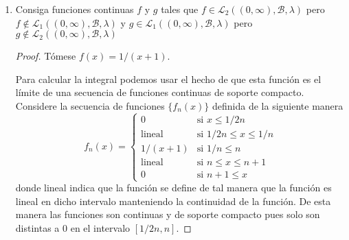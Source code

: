 \documentclass[letter,twoside,12pt]{article}
\numberwithin{equation}{section}
\begin{document}
\begin{enumerate}[label = (\textbf{\arabic*.})]
\begin{proof}
Por otra parte tenemos que para todo $x \in \mathbb{R}_{\geq0} $

$$ 0 \leq \frac{d}{dx} \ln(1+x) = \frac{1}{1+x} \leq 1 = \frac{d}{dx} x. $$

Esto quiere decir, por una parte que ambas funciones son crecientes para $x > 0$ y por otra que la función $x$ crece más rápido que la función $\ln(1+x)$. Por lo tanto concluimos \eqref{eq:ln}.

Podemos usar \eqref{eq:ln} para el caso $x = f/n $ para concluir que

$$ \ln(1+f/n) \leq f/n. $$

A partir de esta expresión se deduce fácilmente que 

$$ n\ln(1+(f/n)^\alpha) \leq \alpha n\ln(1+f/n)  \leq \alpha f. $$

Por lo tanto, concluimos que la secuencia es dominada por $ \alpha f $ y por lo tanto podemos utilizar el teorema de convergencia dominada \cite[Teorema 12.24]{hewitt} para concluir que 

\begin{equation}
\lim_{n \to \infty} \int_X n \ln(1+(f/n)^\alpha) = \int_X \lim_{n \to \infty}  n\ln(1+(f/n)^\alpha))
\end{equation}

de donde concluimos por \eqref{eq:lim} que si $ \alpha = 1 $ entonces la expresión es igual a $ \int_X f d\mu = c $ y si $ \alpha \geq 1 $ entonces la expresión es igual a $ \int_X 0 d\mu = 0 $ 
\end{proof}
\item  Consiga funciones continuas $ f $ y $ g $ tales que $ f \in \mathcal{L}_2((0, \infty), \mathcal{B}, \lambda) $ pero $ f \not \in \mathcal{L}_1((0, \infty), \mathcal{B}, \lambda) $ y
$ g \in \mathcal{L}_1((0, \infty), \mathcal{B}, \lambda)$ pero  $g \not \in \mathcal{L}_2((0, \infty), \mathcal{B}, \lambda) $
\begin{proof}

Tómese $ f(x) = 1/(x+1) $.

Para calcular la integral podemos usar el hecho de que esta función es el límite de una secuencia de funciones continuas de soporte compacto. Considere la secuencia de funciones $ \{ f_{n}(x) \}$ definida de la siguiente manera
$$f_n(x) = \left\{\begin{array}{ll}
0 & \mbox{si } x \leq 1/2n
\\\mbox{lineal} & \mbox{si } 1/2n \leq x \leq 1/n
\\1/(x+1) & \mbox{si } 1/n \leq n 
\\\mbox{lineal} & \mbox{si } n \leq x \leq n+1
\\0 & \mbox{si } n+1 \leq x
\end{array} 
\right. $$
donde lineal indica que la función se define de tal manera que la función es lineal en dicho intervalo manteniendo la continuidad de la función. De esta manera las funciones son continuas y de soporte compacto pues solo son distintas a 0 en el intervalo $[1/2n, n]$.


\end{proof}
\end{enumerate}
\end{document}
